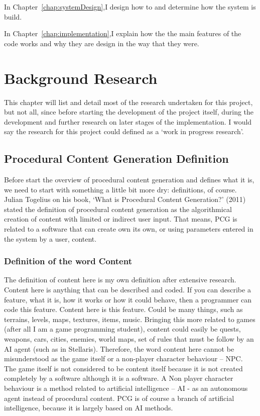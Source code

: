 \documentclass[a4paper,12pt]{book}
\begin{document}
In Chapter~\ref{chap:systemDesign},I design how to and determine how the system is build.

In Chapter~\ref{chap:implementation},I explain how the the main features of the code works and why they are design in the way that they were.


\chapter{Background Research}
\label{chap:backgroundResearch}

This chapter will list and detail most of the research undertaken for this project, but not all, since before starting the development of the project itself, during the development and further research on later stages of the implementation. I would say the research for this project could defined as a ‘work in progress research’. 

\section{Procedural Content Generation Definition}
\label{sec:PCGD}

Before start the overview of procedural content generation and defines what it is, we need to start with something a little bit more dry: definitions, of course. 
Julian Togelius on his book, ‘What is Procedural Content Generation?’ (2011) stated the definition of procedural content generation as the algorithmical creation of content with limited or indirect user input.
That means, PCG is related to a software that can create own its own, or using parameters entered in the system by a user, content.
  


\subsection{Definition of the word Content}
\label{sub:DOTWC}

The definition of content here is my own definition after extensive research. Content here is anything that can be described and coded. If you can describe a feature, what it is, how it works or how it could behave, then a programmer can code this feature. Content here is this feature. Could be many things, such as terrains, levels, maps, textures, items, music. Bringing this more related to games (after all I am a game programming student), content could easily be quests, weapons, cars, cities, enemies, world maps, set of rules that must be follow by an AI agent (such as in Stellaris).
Therefore, the word content here cannot be misunderstood as the game itself or a non-player character behaviour – NPC. The game itself is not considered to be content itself because it is not created completely by a software although it is a software. A Non player character behaviour is a method related to artificial intelligence – AI -  as an autonomous agent instead of procedural content. PCG is of course a branch of artificial intelligence, because it is largely based on AI methods.
\end{document}
